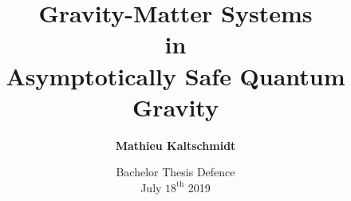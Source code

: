 \title[Gravity-Matter Systems \& Asymptotic Safety]{\textbf{Gravity-Matter Systems \\in \\Asymptotically Safe Quantum Gravity}}
\author[Mathieu Kaltschmidt]{\textbf{Mathieu Kaltschmidt}}


\date[Heidelberg | July $18^{\text{th}}$ 2019]
{
Bachelor Thesis Defence \\
July $18^{\text{th}}$ 2019
}



\usepackage{amsmath, amssymb, commath, mathtools}
\usepackage{physics}
\usepackage{xfrac}
\usepackage[separate-uncertainty]{siunitx}


\usepackage{array} %
\usepackage{booktabs} %

\usepackage{fontspec, xunicode}
\usepackage[utf8]{inputenc}
\usepackage{lmodern}
\setsansfont{Palatino}
\setmonofont[Scale=MatchLowercase]{Menlo}
\usepackage{polyglossia}
\setmainlanguage{english}
\usepackage{microtype}

\usepackage{graphicx} %
\usepackage{float} %
\usepackage{blindtext} %
\usepackage[labelfont=bf]{caption} %
\usepackage{subcaption} %

\usepackage[
	style=numeric-comp,
	backend=biber,
	isbn=false,
	date=year,
	url=false,
	doi=false,
	hyperref = auto
]{biblatex}


\beamertemplatenavigationsymbolsempty

